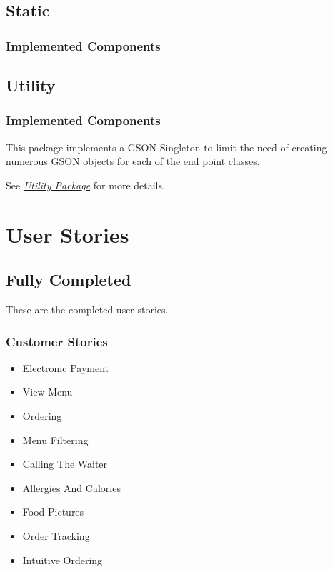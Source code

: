 \documentclass[12pt, twoside, a4paper]{report}
\begin{document}
\section*{Static}\label{sec:static}
\subsection*{Implemented Components}

\section*{Utility}\label{sec:util}
\subsection*{Implemented Components}
This package implements a GSON Singleton to limit the need of creating numerous GSON objects for each of the end point classes.

See \textit{\href{run:../JavaDoc/util/package-summary.html}{Utility Package}} for more details.

\chapter*{User Stories}
\section*{Fully Completed}
These are the completed user stories.
\subsection*{Customer Stories}
\begin{itemize}
  \item Electronic Payment
  \item View Menu
  \item Ordering
  \item Menu Filtering
  \item Calling The Waiter
  \item Allergies And Calories
  \item Food Pictures
  \item Order Tracking
  \item Intuitive Ordering
\end{itemize}
\end{document}
